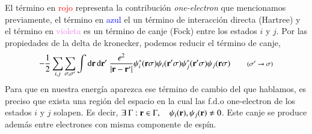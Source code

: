 El término en \textcolor{red}{rojo} representa la contribución \emph{one-electron} que mencionamos previamente, el término en \textcolor{blue}{azul} el un término de interacción directa (Hartree) y el término en \textcolor{violet}{violeta} es un término de canje (Fock) entre los estados $i$ y $j$. Por las propiedades de la delta de kronecker, podemos reducir el término de canje,
\[  
-\frac{1}{2} \sum_{i,j} \sum_{\sigma,\sigma'} \int  \D{\B{r},\B{r'}} \ \frac{e^2}{|\B{r} - \B{r'}|}  \psi_i ^*(\B{r}\sigma )\psi_i(\B{r'}\sigma) \psi^*_j(\B{r'}\sigma) \psi_j (\B{r}\sigma )\qquad  \text{\footnotesize (\( \sigma' \to \sigma  \))}
\]
Para que en nuestra energía aparezca ese término de cambio del que hablamos, es preciso que exista una región del espacio en la cual las f.d.o one-electron de los estados $i$ y $j$ solapen. Es decir, \( \exists \ \Gamma : \mathbf{r} \in \Gamma ,\quad \psi_i(\mathbf{r}),\psi_j(\mathbf{r}) \neq 0   \). Este canje se produce además entre electrones con misma componente de espín. 